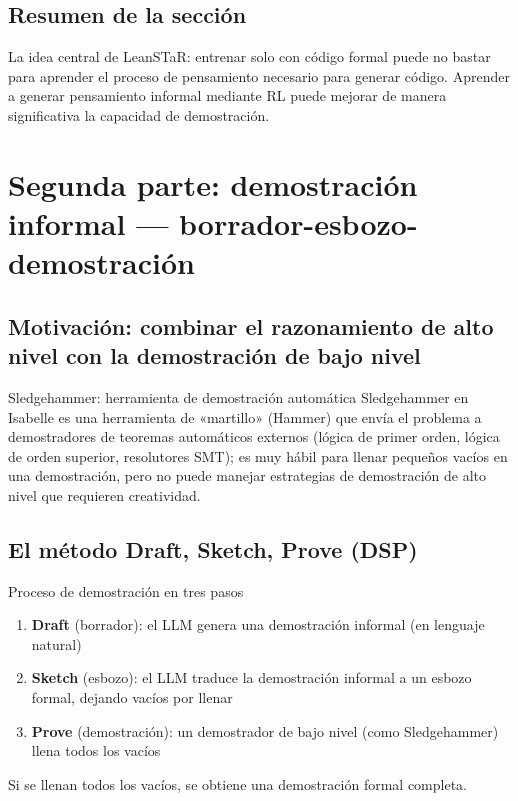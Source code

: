 \documentclass[a4paper]{article}
\begin{document}
\subsection{Resumen de la sección}

La idea central de LeanSTaR: entrenar solo con código formal puede no bastar para aprender el proceso de pensamiento necesario para generar código. Aprender a generar pensamiento informal mediante RL puede mejorar de manera significativa la capacidad de demostración.
\section{Segunda parte: demostración informal — borrador-esbozo-demostración}

\subsection{Motivación: combinar el razonamiento de alto nivel con la demostración de bajo nivel}

\begin{knowledgebox}{Sledgehammer: herramienta de demostración automática}
Sledgehammer en Isabelle es una herramienta de «martillo» (Hammer) que envía el problema a demostradores de teoremas automáticos externos (lógica de primer orden, lógica de orden superior, resolutores SMT); es muy hábil para llenar pequeños vacíos en una demostración, pero no puede manejar estrategias de demostración de alto nivel que requieren creatividad.
\end{knowledgebox}

\subsection{El método Draft, Sketch, Prove (DSP)}

\begin{importantbox}{Proceso de demostración en tres pasos}
\begin{enumerate}
    \item \textbf{Draft} (borrador): el LLM genera una demostración informal (en lenguaje natural)
    \item \textbf{Sketch} (esbozo): el LLM traduce la demostración informal a un esbozo formal, dejando vacíos por llenar
    \item \textbf{Prove} (demostración): un demostrador de bajo nivel (como Sledgehammer) llena todos los vacíos
\end{enumerate}
Si se llenan todos los vacíos, se obtiene una demostración formal completa.
\end{importantbox}
\end{document}
